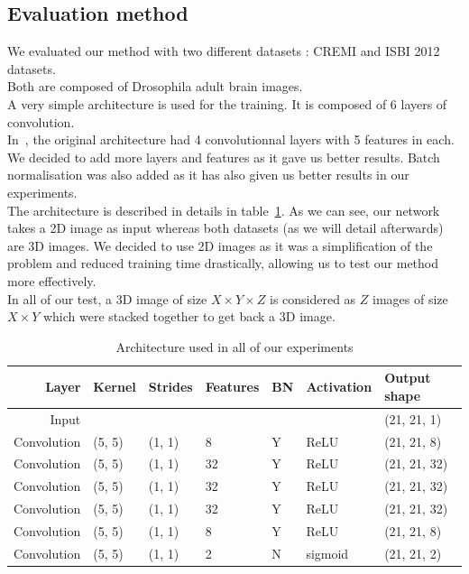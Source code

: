 \subsection{Evaluation method}
We evaluated our method with two different datasets : CREMI and ISBI 2012 datasets.\\
Both are composed of Drosophila adult brain images.\\

A very simple architecture is used for the training.
It is composed of 6 layers of convolution.\\
In~\cite{turaga_maximin_2009}, the original architecture had 4 convolutionnal
layers with 5 features in each. We decided to add more layers and features as
it gave us better results. 
Batch normalisation was also added as it has also given us better results in
our experiments.\\

The architecture is described in details in table~\ref{tab:archi}. As we can
see, our network takes a 2D image as input whereas both datasets (as we will
detail afterwards) are 3D images. We decided to use 2D images as it was a
simplification of the problem and reduced training time drastically, allowing
us to test our method more effectively.\\
In all of our test, a 3D image of size $X\times Y\times Z$ is considered as $Z$
images of size $X\times Y$ which were stacked together to get back a 3D image.\\

\begin{table}[!htbp]
	\centering
	\begin{tabular}{rllllll}\toprule
		Layer & Kernel & Strides & Features & BN &  Activation & Output shape \\
		\midrule
		Input  &  &  & & & & (21, 21, 1)  \\
		Convolution & (5, 5) & (1, 1) & 8 & Y & ReLU  & (21, 21, 8)  \\
		Convolution & (5, 5) & (1, 1) & 32 & Y & ReLU  & (21, 21, 32)  \\
		Convolution & (5, 5) & (1, 1) & 32 & Y & ReLU  & (21, 21, 32)  \\
		Convolution & (5, 5) & (1, 1) & 32 & Y & ReLU  & (21, 21, 32)  \\
		Convolution & (5, 5) & (1, 1) & 8 & Y & ReLU  & (21, 21, 8)  \\
		Convolution & (5, 5) & (1, 1) & 2 & N & sigmoid  & (21, 21, 2)  \\
		\bottomrule
	\end{tabular}
	\caption{Architecture used in all of our experiments}
	\label{tab:archi}
\end{table}


